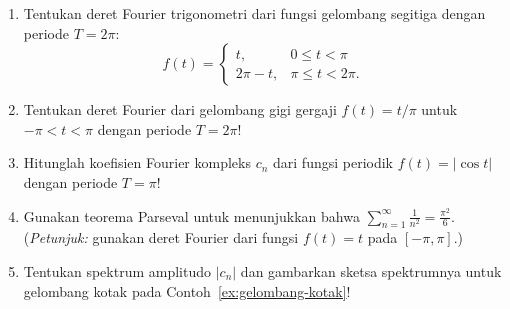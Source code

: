 \begin{enumerate}
  \item Tentukan deret Fourier trigonometri dari fungsi gelombang segitiga dengan periode $T = 2\pi$:
  \[
    f(t) = \begin{cases} t, & 0 \le t < \pi \\ 2\pi - t, & \pi \le t < 2\pi. \end{cases}
  \]
  \item Tentukan deret Fourier dari gelombang gigi gergaji $f(t) = t/\pi$ untuk $-\pi < t < \pi$ dengan periode $T = 2\pi$!
  \item Hitunglah koefisien Fourier kompleks $c_n$ dari fungsi periodik $f(t) = |\cos t|$ dengan periode $T = \pi$!
  \item Gunakan teorema Parseval untuk menunjukkan bahwa $\displaystyle\sum_{n=1}^{\infty}\frac{1}{n^2} = \frac{\pi^2}{6}$. (\textit{Petunjuk:} gunakan deret Fourier dari fungsi $f(t) = t$ pada $[-\pi, \pi]$.)
  \item Tentukan spektrum amplitudo $|c_n|$ dan gambarkan sketsa spektrumnya untuk gelombang kotak pada Contoh~\ref{ex:gelombang-kotak}!
\end{enumerate}
